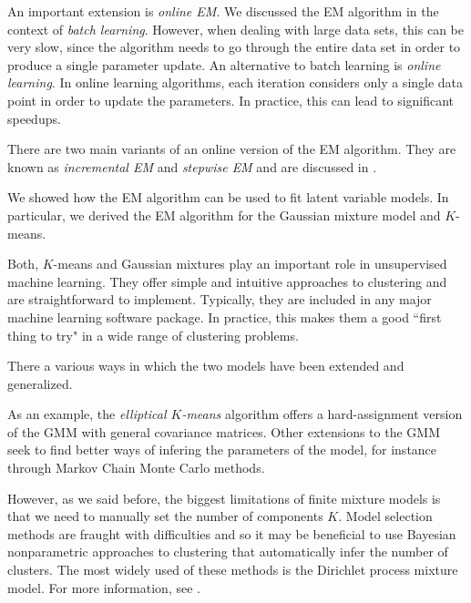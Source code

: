 \documentclass[final,3p,times,twocolumn]{elsarticle}
\begin{document}
An important extension is \emph{online EM}.
We discussed the EM algorithm in the context of \emph{batch learning}. 
However, when dealing with large data sets, this can be very slow, since the algorithm needs to go through the entire data set in order to produce a single parameter update.
An alternative to batch learning is \emph{online learning}. 
In online learning algorithms, each iteration considers only a single data point in order to update the parameters.
In practice, this can lead to significant speedups.

There are two main variants of an online version of the EM algorithm.
They are known as \emph{incremental EM} and \emph{stepwise EM} and are discussed in \cite{liang2009}.

We showed how the EM algorithm can be used to fit latent variable models.
In particular, we derived the EM algorithm for the Gaussian mixture model and $K$-means.

Both, $K$-means and Gaussian mixtures play an important role in unsupervised machine learning.
They offer simple and intuitive approaches to clustering and are straightforward to implement.
Typically, they are included in any major machine learning software package.
In practice, this makes them a good ``first thing to try" in a wide range of clustering problems.

There a various ways in which the two models have been extended and generalized.

As an example, the \emph{elliptical $K$-means} algorithm \cite{sung1998} offers a hard-assignment version of the GMM with general covariance matrices.
Other extensions to the GMM seek to find better ways of infering the parameters of the model, for instance through Markov Chain Monte Carlo methods.

However, as we said before, the biggest limitations of finite mixture models is that we need to manually set the number of components $K$.
Model selection methods are fraught with difficulties and so it may be beneficial to use Bayesian nonparametric approaches to clustering that automatically infer the number of clusters.
The most widely used of these methods is the Dirichlet process mixture model. 
For more information, see \cite{Murphy, Teh2010a}.

\appendix


\end{document}
